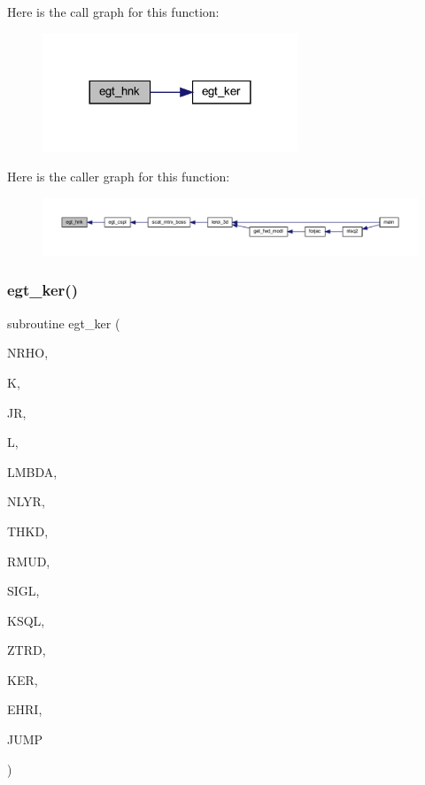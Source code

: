 Here is the call graph for this function\+:\nopagebreak
\begin{figure}[H]
\begin{center}
\leavevmode
\includegraphics[width=216pt]{Leroi_8f90_ae50e88569c7037d3d431d0b0dd30c795_cgraph}
\end{center}
\end{figure}
Here is the caller graph for this function\+:\nopagebreak
\begin{figure}[H]
\begin{center}
\leavevmode
\includegraphics[width=350pt]{Leroi_8f90_ae50e88569c7037d3d431d0b0dd30c795_icgraph}
\end{center}
\end{figure}
\mbox{\label{Leroi_8f90_ad8346887f578fa81508d64ff7308bd70}} 
\subsubsection{\texorpdfstring{egt\+\_\+ker()}{egt\_ker()}}
{\footnotesize\ttfamily subroutine egt\+\_\+ker (\begin{DoxyParamCaption}\item[{integer}]{N\+R\+HO,  }\item[{integer}]{K,  }\item[{integer}]{JR,  }\item[{integer}]{L,  }\item[{real (kind=ql)}]{L\+M\+B\+DA,  }\item[{integer}]{N\+L\+YR,  }\item[{real (kind=ql), dimension(nlyr)}]{T\+H\+KD,  }\item[{real (kind=ql), dimension(0\+:nlyr)}]{R\+M\+UD,  }\item[{complex (kind=ql), dimension(nlyr)}]{S\+I\+GL,  }\item[{complex (kind=ql), dimension(nlyr)}]{K\+S\+QL,  }\item[{real (kind=ql)}]{Z\+T\+RD,  }\item[{complex (kind=ql), dimension(jnlo-\/nrho\+:jnhi,6)}]{K\+ER,  }\item[{complex (kind=ql), dimension(nrho,6)}]{E\+H\+RI,  }\item[{logical}]{J\+U\+MP }\end{DoxyParamCaption})}

